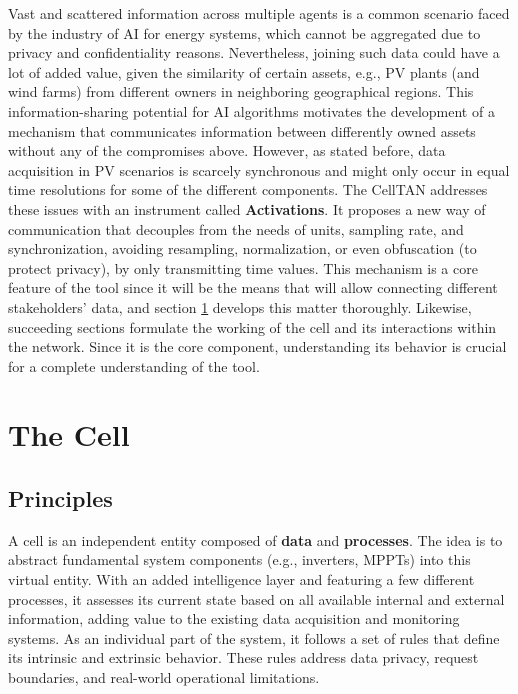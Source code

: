 Vast and scattered information across multiple agents is a common scenario faced by the industry of AI for energy systems, which cannot be aggregated due to privacy and confidentiality reasons. Nevertheless, joining such data could have a lot of added value, given the similarity of certain assets, e.g., PV plants (and wind farms) from different owners in neighboring geographical regions. This information-sharing potential for AI algorithms motivates the development of a mechanism that communicates information between differently owned assets without any of the compromises above. However, as stated before, data acquisition in PV scenarios is scarcely synchronous and might only occur in equal time resolutions for some of the different components. The CellTAN addresses these issues with an instrument called \textbf{Activations}. It proposes a new way of communication that decouples from the needs of units, sampling rate, and synchronization, avoiding resampling, normalization, or even obfuscation (to protect privacy), by only transmitting time values. This mechanism is a core feature of the tool since it will be the means that will allow connecting different stakeholders' data, and section \ref{sec:thecell} develops this matter thoroughly. Likewise, succeeding sections formulate the working of the cell and its interactions within the network. Since it is the core component, understanding its behavior is crucial for a complete understanding of the tool.

\section{The Cell} \label{sec:thecell}

\subsection{Principles}

A cell is an independent entity composed of \textbf{data} and \textbf{processes}. The idea is to abstract fundamental system components (e.g., inverters, MPPTs) into this virtual entity. With an added intelligence layer and featuring a few different processes, it assesses its current state based on all available internal and external information, adding value to the existing data acquisition and monitoring systems. As an individual part of the system, it follows a set of rules that define its intrinsic and extrinsic behavior. These rules address data privacy, request boundaries, and real-world operational limitations.

